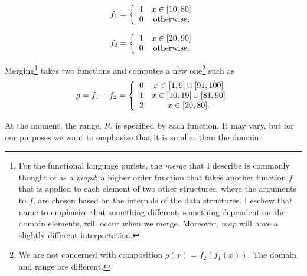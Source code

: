 \documentclass{article}
\begin{document}
\begin{minipage}{.5\linewidth}
\begin{displaymath}
  f_{1} = \left\{
        \begin{array}{c c}
          1 & x \in [10,80] \\
          0 & \text{otherwise,} \\ %
        \end{array}
     \right.
\end{displaymath}
\end{minipage}%
\begin{minipage}{.5\linewidth}
\begin{displaymath}
  f_{2} = \left\{
        \begin{array}{c c}
          1 & x \in [20,90] \\
          0 & \text{otherwise.} \\ %
        \end{array}
     \right.
\end{displaymath}
\end{minipage}
Merging\footnote{For the functional language purists, the \emph{merge} that I
describe is commonly thought of as a \emph{map2}; a higher order function that
takes another function $f$ that is applied to each element of two other
structures,
where the arguments to $f$,
are chosen based on the internals of the data structures.
I eschew that name to emphasize that something different,
something dependent on the domain elements, 
will occur when we merge.
Moreover, \emph{map} will have a slightly different interpretation. }
takes two functions and computes a new
one\footnote{We are not concerned with composition $g(x)=f_{2}(f_{1}(x))$.
The domain and range are different.}
such as 
\begin{displaymath}
  g = f_{1}+f_{2} = \left\{
        \begin{array}{c c}
          0 & x \in [1,9] \cup [91,100] \\
          1 & x \in [10,19] \cup [81,90] \\
          2 & x \in [20,80]. \\
        \end{array}
     \right.
\end{displaymath}
\begin{comment}
\begin{displaymath}
  g_{2} = f_{1}+f_{2}\bmod 2 = \left\{
        \begin{array}{c c}
          0 & x \in [0,9] \cup [20,80] \cup [91,100] \\
          1 & x \in [10,19] \cup [81,90] \\
        \end{array}
     \right.
\end{displaymath}
\end{comment}
At the moment, the range, $R$, is specified by each function.
It may vary, but for our purposes we want to emphasize that it is smaller
than the domain.
\end{document}
